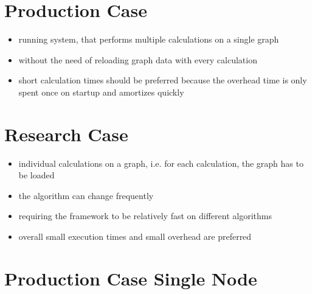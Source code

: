 \documentclass{meetings}
\begin{document}
\clearpage
\begin{multicols}{2}
\section{Production Case}
\begin{itemize}
	\item running system, that performs multiple calculations on a single graph
	\item without the need of reloading graph data with every calculation
	\item short calculation times should be preferred because the overhead time is only spent once on startup and amortizes quickly
\end{itemize}

\columnbreak
\section{Research Case}
\begin{itemize}
	\item individual calculations on a graph, i.e. for each calculation, the graph has to be loaded
	\item the algorithm can change frequently
	\item requiring the framework to be relatively fast on different algorithms
	\item overall small execution times and small overhead are preferred
\end{itemize}
\end{multicols}


\section{Production Case Single Node}
\end{document}
